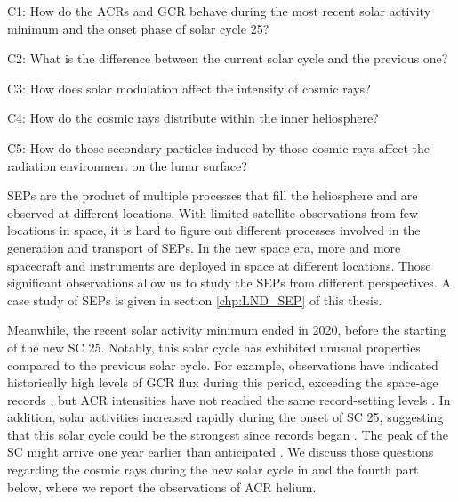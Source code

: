 
\begin{tcolorbox}[colback=blue!5!white,colframe=blue!75!black,title=Scientific questions - cosmic rays]
	C1: How do the \acp{ACR} and \ac{GCR} behave during the most recent solar activity minimum and the onset phase of solar cycle 25? \\ \hfill

	C2: What is the difference between the current solar cycle and the previous one?\\ 
	\hfill

	C3: How does solar modulation affect the intensity of cosmic rays?  \\
	\hfill

	C4: How do the cosmic rays distribute within the inner heliosphere?  \\
	\hfill

C5: How do those secondary particles induced by those cosmic rays affect the radiation environment on the lunar surface?
\end{tcolorbox}
	

\acp{SEP} are the product of multiple processes that fill the heliosphere and are observed at different locations. With limited satellite observations from few locations in space, it is hard to figure out different processes involved in the generation and transport of \acp{SEP}. In the new space era, more and more spacecraft and instruments are deployed in space at different locations. Those significant observations allow us to study the \acp{SEP} from different perspectives. A case study of \acp{SEP} is given in section \ref{chp:LND_SEP} of this thesis.

Meanwhile, the recent solar activity minimum ended in 2020, before the starting of the new \ac{SC} 25. Notably, this solar cycle has exhibited unusual properties compared to the previous solar cycle. For example, observations have indicated historically high levels of \ac{GCR} flux during this period, exceeding the space-age records \citep{Fu2021ApJS, Xu2022FrASS}, but \ac{ACR} intensities have not reached the same record-setting levels \citep{Strauss2023ApJ}. 
In addition, solar activities increased rapidly during the onset of \ac{SC} 25, suggesting that this solar cycle could be the strongest since records began \citep{Nagovitsyn2023SoPh}. The peak of the \ac{SC} might arrive one year earlier than anticipated \citep{Prasad2023SoPh,McIntosh2020SoPh}. 
We discuss those questions regarding the cosmic rays during the new solar cycle in \citet{Xu2022FrASS,Mason-2021-SolOQuietTime} and the fourth part below, where we report the observations of \ac{ACR} helium.



